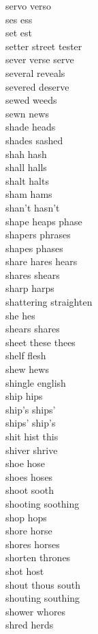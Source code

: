 servo verso\\
ses ess\\
set est\\
setter street tester\\
sever verse serve\\
several reveals\\
severed deserve\\
sewed weeds\\
sewn news\\
shade heads\\
shades sashed\\
shah hash\\
shall halls\\
shalt halts\\
sham hams\\
shan't hasn't\\
shape heaps phase\\
shapers phrases\\
shapes phases\\
share hares hears\\
shares shears\\
sharp harps\\
shattering straighten\\
she hes\\
shears shares\\
sheet these thees\\
shelf flesh\\
shew hews\\
shingle english\\
ship hips\\
ship's ships'\\
ships' ship's\\
shit hist this\\
shiver shrive\\
shoe hose\\
shoes hoses\\
shoot sooth\\
shooting soothing\\
shop hops\\
shore horse\\
shores horses\\
shorten thrones\\
shot host\\
shout thous south\\
shouting southing\\
shower whores\\
shred herds\\
